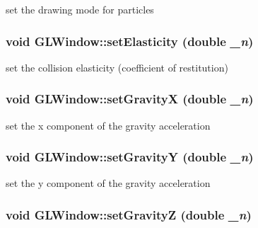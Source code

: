 set the drawing mode for particles \hypertarget{classGLWindow_a80e51bff824a82ab5b1196eb79678383}{
\subsubsection[{setElasticity}]{\setlength{\rightskip}{0pt plus 5cm}void GLWindow::setElasticity (double {\em \_\-n})}}
\label{classGLWindow_a80e51bff824a82ab5b1196eb79678383}


set the collision elasticity (coefficient of restitution) \hypertarget{classGLWindow_ace93ca1230eb0655bad846e3c45b4130}{
\subsubsection[{setGravityX}]{\setlength{\rightskip}{0pt plus 5cm}void GLWindow::setGravityX (double {\em \_\-n})}}
\label{classGLWindow_ace93ca1230eb0655bad846e3c45b4130}


set the x component of the gravity acceleration \hypertarget{classGLWindow_ac6d036c5dee3fcd44ca2ad3f762d96b8}{
\subsubsection[{setGravityY}]{\setlength{\rightskip}{0pt plus 5cm}void GLWindow::setGravityY (double {\em \_\-n})}}
\label{classGLWindow_ac6d036c5dee3fcd44ca2ad3f762d96b8}


set the y component of the gravity acceleration \hypertarget{classGLWindow_accef41ba5c67d1504a8f7496337a610c}{
\subsubsection[{setGravityZ}]{\setlength{\rightskip}{0pt plus 5cm}void GLWindow::setGravityZ (double {\em \_\-n})}}
\label{classGLWindow_accef41ba5c67d1504a8f7496337a610c}


